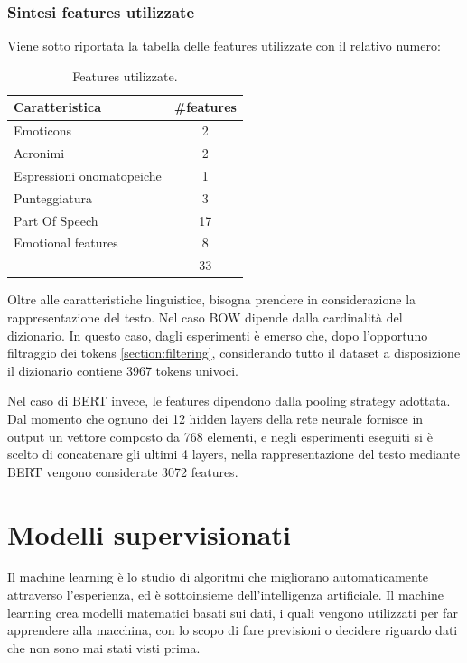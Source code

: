 \documentclass[oneside]{book}
\begin{document}
\subsection{Sintesi features utilizzate}
Viene sotto riportata la tabella delle features utilizzate con il relativo numero:

\begin{table}[h!]
	\centering
	\begin{tabular}[t]{l|c}
		\hline
		\textbf{Caratteristica} & \textbf{\#features} \\
		\hline
		Emoticons  			 & 2 \\
		Acronimi & 2 \\
		Espressioni onomatopeiche  & 1 \\
		Punteggiatura & 3 \\
		Part Of Speech & 17 \\
		Emotional features & 8 \\
		\hline
		& 33 \\
		
	\end{tabular}
	\caption{Features utilizzate.}
\end{table}

Oltre alle caratteristiche linguistice, bisogna prendere in considerazione la rappresentazione del testo. Nel caso BOW dipende dalla cardinalità del dizionario. In questo caso, dagli esperimenti è emerso che, dopo l'opportuno filtraggio dei tokens \ref{section:filtering}, considerando tutto il dataset a disposizione il dizionario contiene 3967 tokens univoci.

Nel caso di BERT invece, le features dipendono dalla pooling strategy adottata. Dal momento che ognuno dei 12 hidden layers della rete neurale fornisce in output un vettore composto da 768 elementi, e negli esperimenti eseguiti si è scelto di concatenare gli ultimi 4 layers, nella rappresentazione del testo mediante BERT vengono considerate 3072 features.

\chapter{Modelli supervisionati}
\label{chap:supervised-models}

Il machine learning è lo studio di algoritmi che migliorano automaticamente attraverso l'esperienza, ed è sottoinsieme dell'intelligenza artificiale. Il machine learning crea modelli matematici basati sui dati, i quali vengono utilizzati per far apprendere alla macchina, con lo scopo di fare previsioni o decidere riguardo dati che non sono mai stati visti prima.
\end{document}
